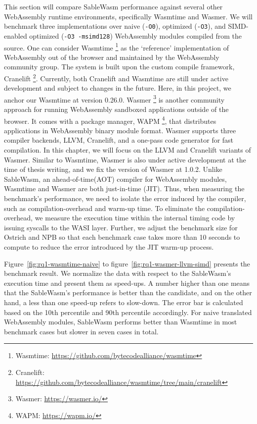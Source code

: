 This section will compare SableWasm performance against several other WebAssembly runtime environments, specifically Wasmtime and Wasmer. We will benchmark three implementations over naive (\texttt{-O0}), optimized (\texttt{-O3}), and SIMD-enabled optimized (\texttt{-O3 -msimd128}) WebAssembly modules compiled from the source. One can consider Wasmtime \footnote{Wasmtime: \url{https://github.com/bytecodealliance/wasmtime}} as the `reference' implementation of WebAssembly out of the browser and maintained by the WebAssembly community group. The system is built upon the  custom compile framework, Cranelift \footnote{Cranelift: \url{https://github.com/bytecodealliance/wasmtime/tree/main/cranelift}}. Currently, both Cranelift and Wasmtime are still under active development and subject to changes in the future. Here, in this project, we anchor our Wasmtime at version 0.26.0. Wasmer \footnote{Wasmer: \url{https://wasmer.io/}} is another community approach for running WebAssembly sandboxed applications outside of the browser. It comes with a package manager, WAPM \footnote{WAPM: \url{https://wapm.io/}}, that distributes applications in WebAssembly binary module format. Wasmer supports three compiler backends, LLVM, Cranelift, and a one-pass code generator for fast compilation. In this chapter, we will focus on the LLVM and Cranelift variants of Wasmer. Similar to Wasmtime, Wasmer is also under active development at the time of thesis writing, and we fix the version of Wasmer at 1.0.2. Unlike SableWasm, an ahead-of-time(AOT) compiler for WebAssembly modules, Wasmtime and Wasmer are both just-in-time (JIT). Thus, when measuring the benchmark's performance, we need to isolate the error induced by the compiler, such as compilation-overhead and warm-up time. To eliminate the compilation-overhead, we measure the execution time within the internal timing code by issuing syscalls to the WASI layer. Further, we adjust the benchmark size for Ostrich and NPB so that each benchmark case takes more than 10 seconds to compute to reduce the error introduced by the JIT warm-up process.

Figure~\ref{fig:rq1-wasmtime-naive} to figure~\ref{fig:rq1-wasmer-llvm-simd} presents the benchmark result. We normalize the data with respect to the SableWasm's execution time and present them as speed-ups. A number higher than one means that the SableWasm's performance is better than the candidate, and on the other hand, a less than one speed-up refers to slow-down. The error bar is calculated based on the  10th percentile and 90th percentile accordingly. For naive translated WebAssembly modules, SableWasm performs better than Wasmtime in most benchmark cases but slower in seven cases in total.

